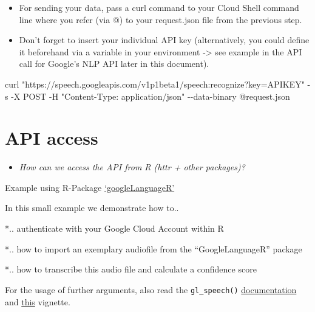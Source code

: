 \documentclass[
]{book}
\newenvironment{Shaded}{\begin{snugshade}}{\end{snugshade}}
\newcommand{\NormalTok}[1]{#1}
\newcommand{\SpecialCharTok}[1]{\textcolor[rgb]{0.00,0.00,0.00}{#1}}
\newcommand{\StringTok}[1]{\textcolor[rgb]{0.31,0.60,0.02}{#1}}
\providecommand{\tightlist}{%
  \setlength{\itemsep}{0pt}\setlength{\parskip}{0pt}}
\begin{document}
\begin{itemize}
\item
  For sending your data, pass a curl command to your Cloud Shell command line where you refer (via @) to your request.json file from the previous step.
\item
  Don't forget to insert your individual API key (alternatively, you could define it beforehand via a variable in your environment -\textgreater{} see example in the API call for Google's NLP API later in this document).
\end{itemize}

\begin{Shaded}
\begin{Highlighting}[]
\NormalTok{curl }\StringTok{"https://speech.googleapis.com/v1p1beta1/speech:recognize?key=APIKEY"} \SpecialCharTok{{-}}\NormalTok{s }\SpecialCharTok{{-}}\NormalTok{X POST }\SpecialCharTok{{-}}\NormalTok{H }\StringTok{"Content{-}Type: application/json"} \SpecialCharTok{{-}{-}}\NormalTok{data}\SpecialCharTok{{-}}\NormalTok{binary }\SpecialCharTok{@}\NormalTok{request.json}
\end{Highlighting}
\end{Shaded}

\hypertarget{api-access-4}{%
\section{API access}\label{api-access-4}}

\begin{itemize}
\tightlist
\item
  \emph{How can we access the API from R (httr + other packages)?}
\end{itemize}

Example using R-Package \href{\%22https://cran.r-project.org/web/packages/googleLanguageR/index.html\%22}{`googleLanguageR'}

In this small example we demonstrate how to..

*.. authenticate with your Google Cloud Account within R

*.. how to import an exemplary audiofile from the ``GoogleLanguageR'' package

*.. how to transcribe this audio file and calculate a confidence score

For the usage of further arguments, also read the \texttt{gl\_speech()} \href{\%22https://cran.r-project.org/web/packages/googleLanguageR/googleLanguageR.pdf\%22}{documentation} and \href{\%22https://cran.r-project.org/web/packages/googleLanguageR/vignettes/speech.html\%22}{this} vignette.
\end{document}
